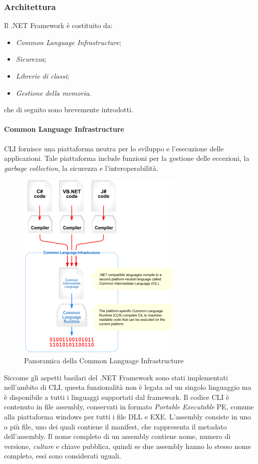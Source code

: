\subsubsection{Architettura}
Il .NET Framework è costituito da:
\begin{itemize}
\item \emph{Common Language Infrastructure};
\item \emph{Sicurezza};
\item \emph{Librerie di classi};
\item \emph{Gestione della memoria}.
\end{itemize}
che di seguito sono brevemente introdotti.
\paragraph{Common Language Infrastructure}
CLI fornisce una piattaforma neutra per lo sviluppo e l'esecuzione delle applicazioni. Tale piattaforma include funzioni per la gestione delle eccezioni, la \emph{garbage collection}, la sicurezza e l'interoperabilità.
\begin{figure}
\begin{center}
\includegraphics[scale=0.4]{imgs/commonlanguageinfrastructure.png} 
\caption{Panoramica della Common Language Infrastructure\label{commonlanguageinfrastructure}}
\end{center}
\end{figure}
Siccome gli aspetti basilari del .NET Framework sono stati implementati nell'ambito di CLI, questa funzionalità non è legata ad un singolo linguaggio ma è disponibile a tutti i linguaggi supportati dal framework.
Il codice CLI è contenuto in file assembly, conservati in formato \emph{Portable Executable} PE, comune alla piattaforma windows per tutti i file DLL e EXE.
L'assembly consiste in uno o più file, uno dei quali contiene il manifest, che rappresenta il metadato dell'assembly.
Il nome completo di un assembly contiene nome, numero di versione, \emph{culture} e chiave pubblica, quindi se due assembly hanno lo stesso nome completo, essi sono considerati uguali.



